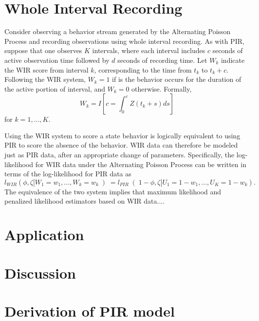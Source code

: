 \documentclass[man, noextraspace, floatsintext]{apa6}\usepackage[]{graphicx}\usepackage[]{color}
\newcommand{\bibfile}{C:/Users/jep2963/Documents/Bibliography/Behavioral_observation-APP}
\begin{document}
\section{Whole Interval Recording}
\label{sec:WIR}

Consider observing a behavior stream generated by the Alternating Poisson Process and recording observations using whole interval recording. As with PIR, suppose that one observes $K$ intervals, where each interval includes $c$ seconds of active observation time followed by $d$ seconds of recording time. Let $W_k$ indicate the WIR score from interval $k$, corresponding to the time from $t_k$ to $t_k + c$. Following the WIR system, $W_k = 1$ if is the behavior occurs for the duration of the active portion of interval, and $W_k = 0$ otherwise. Formally, 
\begin{equation}
W_k = I\left[ c = \int_0^c Z\left(t_k + s \right) ds\right]
\end{equation}
for $k = 1,...,K$. 

Using the WIR system to score a state behavior is logically equivalent to using PIR to score the absence of the behavior. WIR data can therefore be modeled just as PIR data, after an appropriate change of parameters. Specifically, the log-likelihood for WIR data under the Alternating Poisson Process can be written in terms of the log-likelihood for PIR data as
\begin{equation}
l_{WIR}\left(\phi, \zeta | W_1 = w_1,...,W_k = w_k \left) = l_{PIR}\right(1 - \phi, \zeta | U_1 = 1 - w_1,...,U_K = 1 - w_k\right).
\end{equation}
The equivalence of the two system implies that maximum likelihood and penalized likelihood estimators based on WIR data.... 


\section{Application}
\label{sec:application}

\section{Discussion}
\label{sec:discussion}



 
\appendix

\section{Derivation of PIR model}
\label{app:PIR_derivation}
\end{document}

